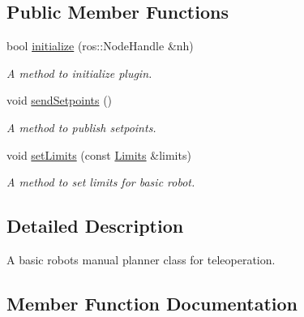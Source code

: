 \subsection*{Public Member Functions}
\begin{DoxyCompactItemize}
\item 
bool \hyperlink{classplanner__plugins_1_1ManualPlanner_af162ecad07107d1d1af87f6ec9b109a3}{initialize} (ros\+::\+Node\+Handle \&nh)
\begin{DoxyCompactList}\small\item\em A method to initialize plugin. \end{DoxyCompactList}\item 
\mbox{\label{classplanner__plugins_1_1ManualPlanner_a6b926f26660792f6ae21c7d9974c7161}} 
void \hyperlink{classplanner__plugins_1_1ManualPlanner_a6b926f26660792f6ae21c7d9974c7161}{send\+Setpoints} ()
\begin{DoxyCompactList}\small\item\em A method to publish setpoints. \end{DoxyCompactList}\item 
void \hyperlink{classplanner__plugins_1_1ManualPlanner_a6052550b915d9e96a6c8e094f3e85d2a}{set\+Limits} (const \hyperlink{structLimits}{Limits} \&limits)
\begin{DoxyCompactList}\small\item\em A method to set limits for basic robot. \end{DoxyCompactList}\end{DoxyCompactItemize}


\subsection{Detailed Description}
A basic robot\textquotesingle{}s manual planner class for teleoperation. 

\subsection{Member Function Documentation}
\mbox{\label{classplanner__plugins_1_1ManualPlanner_af162ecad07107d1d1af87f6ec9b109a3}} 
